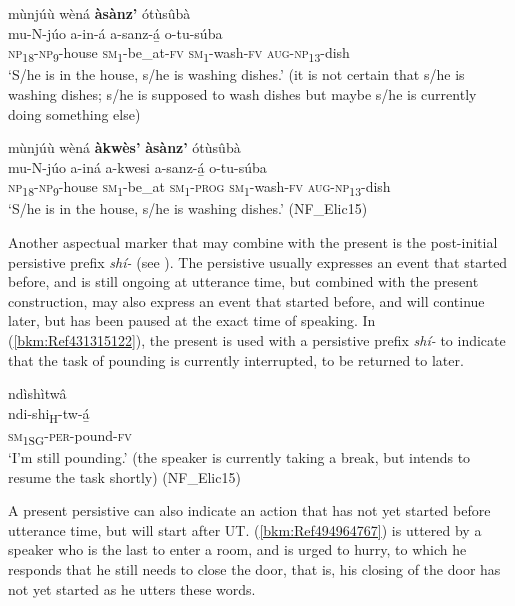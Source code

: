 \ea
\label{bkm:Ref72239269}
mùnjúù wèná \textbf{àsànz’} ótùsûbà\\
\gll mu-N-júo    a-in-á    a-sanz-á̲  o-tu-súba\\
\textsc{np}\textsubscript{18}-\textsc{np}\textsubscript{9}-house  \textsc{sm}\textsubscript{1}-be\_at-\textsc{fv}  \textsc{sm}\textsubscript{1}-wash-\textsc{fv}  \textsc{aug}-\textsc{np}\textsubscript{13}-dish\\
\glt ‘S/he is in the house, s/he is washing dishes.’ (it is not certain that s/he is washing dishes; s/he is supposed to wash dishes but maybe s/he is currently doing something else)
\z

\ea
\label{bkm:Ref467676720}
mùnjúù wèná \textbf{àkwès’} \textbf{àsànz’} ótùsûbà\\
\gll mu-N-júo    a-iná    a-kwesi  a-sanz-á̲  o-tu-súba\\
\textsc{np}\textsubscript{18}-\textsc{np}\textsubscript{9}-house  \textsc{sm}\textsubscript{1}-be\_at  \textsc{sm}\textsubscript{1}-\textsc{prog}  \textsc{sm}\textsubscript{1}-wash-\textsc{fv}  \textsc{aug}-\textsc{np}\textsubscript{13}-dish\\
\glt ‘S/he is in the house, s/he is washing dishes.’ (NF\_Elic15)
\z

Another aspectual marker that may combine with the present is the post-initial persistive prefix \textit{shí-} (see ). The persistive usually expresses an event that started before, and is still ongoing at utterance time, but combined with the present construction, may also express an event that started before, and will continue later, but has been paused at the exact time of speaking. In (\ref{bkm:Ref431315122}), the present is used with a persistive prefix \textit{shí-} to indicate that the task of pounding is currently interrupted, to be returned to later.

\ea
\label{bkm:Ref431315122}
\glll ndìshìtwâ\\
ndi-shi\textsubscript{H}-tw-á̲\\
\textsc{sm}\textsubscript{1SG}-\textsc{per}-pound-\textsc{fv}\\
\glt ‘I’m still pounding.’ (the speaker is currently taking a break, but intends to resume the task shortly) (NF\_Elic15)
\z

A present persistive can also indicate an action that has not yet started before utterance time, but will start after UT. (\ref{bkm:Ref494964767}) is uttered by a speaker who is the last to enter a room, and is urged to hurry, to which he responds that he still needs to close the door, that is, his closing of the door has not yet started as he utters these words.

